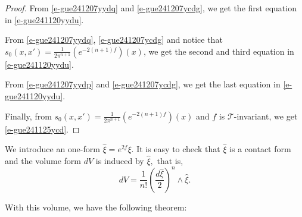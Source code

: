 \documentclass[12pt]{amsart}
\theoremstyle{definition}
\theoremstyle{named}
\numberwithin{equation}{subsection}
\begin{document}
\begin{proof}
From \eqref{e-gue241207yydq} and \eqref{e-gue241207ycdg}, we get the first equation in \eqref{e-gue241120yydu}. 

From \eqref{e-gue241207yydq}, \eqref{e-gue241207ycdg} and notice that $s_0(x,x')=\frac{1}{2\pi^{n+1}}(e^{-2(n+1)f})(x)$, we get the second and third equation in \eqref{e-gue241120yydu}.

From \eqref{e-gue241207yydp} and \eqref{e-gue241207ycdg}, we get the last equation in  \eqref{e-gue241120yydu}.

Finally, from $s_0(x,x')=\frac{1}{2\pi^{n+1}}(e^{-2(n+1)f})(x)$ and $f$ is $\mathcal{T}$-invariant, we get \eqref{e-gue241125ycd}.
\end{proof}

We introduce an one-form $\widehat{\xi}=e^{2f}\xi.$ It is easy to check that $\widehat{\xi}$ is a contact form and the volume form $dV$ is induced by $\widehat{\xi},$ that is, $$dV=\frac{1}{n!}\left(\frac{d\widehat{\xi}}{2}\right)^n\wedge\widehat{\xi}.$$ 




With this volume, we have the following theorem:
\end{document}
